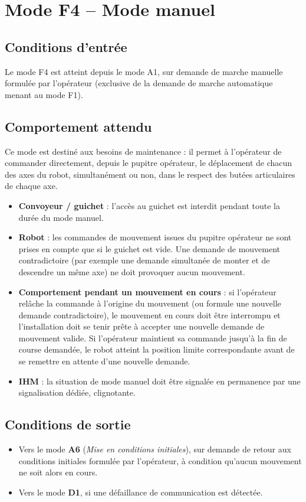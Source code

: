 \section{Mode F4 -- Mode manuel}
\label{secModeF4}

\subsection{Conditions d'entrée}

Le mode F4 est atteint depuis le mode A1, sur demande de marche manuelle
formulée par l'opérateur (exclusive de la demande de marche automatique
menant au mode F1).

\subsection{Comportement attendu}

Ce mode est destiné aux besoins de maintenance : il permet à l'opérateur de
commander directement, depuis le pupitre opérateur, le déplacement de
chacun des axes du robot, simultanément ou non, dans le respect des
butées articulaires de chaque axe.

\begin{itemize}
    \item \textbf{Convoyeur / guichet} : l'accès au guichet est interdit
    pendant toute la durée du mode manuel.
    \item \textbf{Robot} : les commandes de mouvement issues du pupitre
    opérateur ne sont prises en compte que si le guichet est vide. Une
    demande de mouvement contradictoire (par exemple une demande
    simultanée de monter et de descendre un même axe) ne doit provoquer
    aucun mouvement.
    \item \textbf{Comportement pendant un mouvement en cours} : si
    l'opérateur relâche la commande à l'origine du mouvement (ou formule
    une nouvelle demande contradictoire), le mouvement en cours doit être
    interrompu et l'installation doit se tenir prête à accepter une
    nouvelle demande de mouvement valide. Si l'opérateur maintient sa
    commande jusqu'à la fin de course demandée, le robot atteint la
    position limite correspondante avant de se remettre en attente d'une
    nouvelle demande.
    \item \textbf{IHM} : la situation de mode manuel doit être signalée en
    permanence par une signalisation dédiée, clignotante.
\end{itemize}

\subsection{Conditions de sortie}

\begin{itemize}
    \item Vers le mode \textbf{A6} (\emph{Mise en conditions initiales}),
    sur demande de retour aux conditions initiales formulée par
    l'opérateur, à condition qu'aucun mouvement ne soit alors en cours.
    \item Vers le mode \textbf{D1}, si une défaillance de communication est
    détectée.
\end{itemize}
